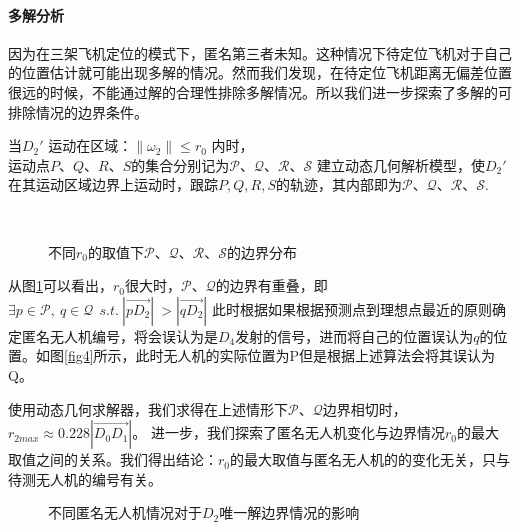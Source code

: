\documentclass{cumcmthesis}
\begin{document}
		
			\paragraph{多解分析}
			因为在三架飞机定位的模式下，匿名第三者未知。这种情况下待定位飞机对于自己的位置估计就可能出现多解的情况。然而我们发现，在待定位飞机距离无偏差位置很远的时候，不能通过解的合理性排除多解情况。所以我们进一步探索了多解的可排除情况的边界条件。
			
			
			当$ D_2' $ 运动在区域：$ \lVert \omega _2 \rVert \le r_0 $ 内时，$ \text{运动点}P\text{、}Q\text{、}R\text{、}S\text{的集合分别记为}\mathcal{P}\text{、}\mathcal{Q}\text{、}\mathcal{R}\text{、}\mathcal{S} $ 建立动态几何解析模型，使$ D_2' $在其运动区域边界上运动时，跟踪$P,Q,R,S$的轨迹，其内部即为$\mathcal{P}\text{、}\mathcal{Q}\text{、}\mathcal{R}\text{、}\mathcal{S}$.
			
			\begin{figure}[H]
				\centering
				\\
				\caption{不同$r_0$的取值下$\mathcal{P}\text{、}\mathcal{Q}\text{、}\mathcal{R}\text{、}\mathcal{S}$的边界分布}
				\label{fig7}
			\end{figure}
			从图\ref{fig7}可以看出，$r_0$很大时，$\mathcal{P}\text{、}\mathcal{Q}$的边界有重叠，即$
			\exists p\in \mathcal{P},\ q\in \mathcal{Q}\ \ s.t.\ \left| \overrightarrow{pD_2} \right|\ >\left| \overrightarrow{qD_2} \right|$ 此时根据如果根据预测点到理想点最近的原则确定匿名无人机编号，将会误认为是$D_4$发射的信号，进而将自己的位置误认为$q$的位置。如图\ref{fig4}所示，此时无人机的实际位置为P但是根据上述算法会将其误认为Q。
			
			使用动态几何求解器，我们求得在上述情形下$\mathcal{P}\text{、}\mathcal{Q}$边界相切时，$r_{2max}\approx 0.228\left| \overrightarrow{D_0D_1} \right|$。
			进一步，我们探索了匿名无人机变化与边界情况$r_0$的最大取值之间的关系。我们得出结论：$r_0$的最大取值与匿名无人机的的变化无关，只与待测无人机的编号有关。
			\begin{figure}[H]
				\centering
				\caption{不同匿名无人机情况对于$D_2$唯一解边界情况的影响}
				\label{fig10}
			\end{figure}
		
\end{document}
